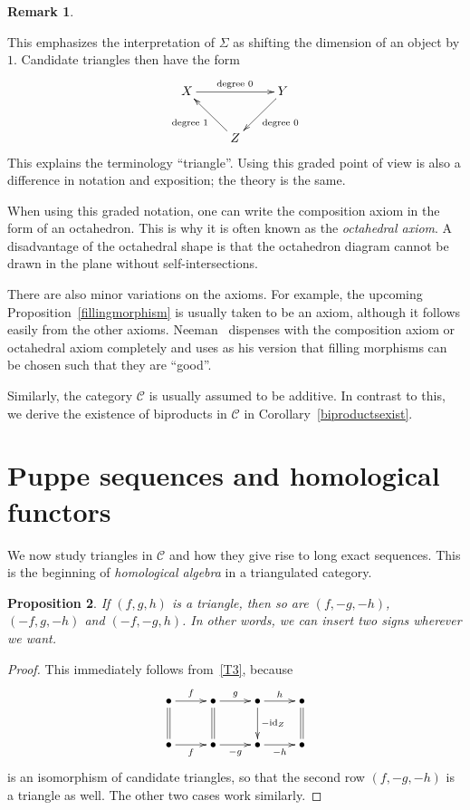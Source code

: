 \documentclass{amsproc}
\newtheorem{prop}{Proposition}[section]
\theoremstyle{definition}
\newtheorem{rem}[prop]{Remark}
\begin{document}
\begin{rem}
\begin{compactenum}
\begin{compactenum}
\begin{displaymath}
\end{displaymath}
This emphasizes the interpretation of $\Sigma$ as shifting the dimension of an object by $1$. Candidate triangles then have the form
\begin{displaymath}
\xymatrix{X\ar[rr]^{\textrm{degree }0} && Y\ar[ld]^{\textrm{degree }0}\\
& Z\ar[lu]^{\textrm{degree }1}}
\end{displaymath}
This explains the terminology ``triangle''. Using this graded point of view is also a difference in notation and exposition; the theory is the same.
\item When using this graded notation, one can write the composition axiom in the form of an octahedron. This is why it is often known as the \emph{octahedral axiom}. A disadvantage of the octahedral shape is that the octahedron diagram cannot be drawn in the plane without self-intersections.
\item There are also minor variations on the axioms. For example, the upcoming Proposition~\ref{fillingmorphism} is usually taken to be an axiom, although it follows easily from the other axioms. Neeman~\cite{Nee} dispenses with the composition axiom or octahedral axiom completely and uses as his version that filling morphisms can be chosen such that they are ``good''. 
\item\label{biprodrem} Similarly, the category ${\mathcal{C}}$ is usually assumed to be additive. In contrast to this, we derive the existence of biproducts in ${\mathcal{C}}$ in Corollary~\ref{biproductsexist}.
\end{compactenum}
\end{compactenum}
\end{rem}

\section{Puppe sequences and homological functors}
\label{homalgebra}

We now study triangles in ${\mathcal{C}}$ and how they give rise to long exact sequences. This is the beginning of \emph{homological algebra} in a triangulated category.

\begin{prop}
\label{signs}
If $(f,g,h)$ is a triangle, then so are $(f,-g,-h)$, $(-f,g,-h)$ and $(-f,-g,h)$. In other words, we can insert two signs wherever we want.
\end{prop}

\begin{proof}
This immediately follows from~\ref{T3}, because
\begin{displaymath}
\xymatrix{ \bullet \ar[r]^f\ar@{=}[d] & \bullet\ar[r]^g\ar@{=}[d] & \bullet\ar[r]^h\ar[d]^{-{\mathrm{id}}_Z} & \bullet \ar@{=}[d]\\
\bullet \ar[r]_f & \bullet\ar[r]_{-g} & \bullet\ar[r]_{-h} & \bullet }
\end{displaymath}
is an isomorphism of candidate triangles, so that the second row $(f,-g,-h)$ is a triangle as well. The other two cases work similarly.
\end{proof}
\end{document}
